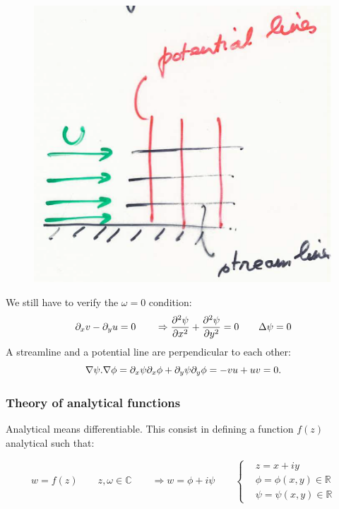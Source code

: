  		\begin{figure}
		\vspace{-5mm}
		\includegraphics[scale=0.3]{ch2/24}
		\label{fig:2.23}
		\end{figure}
		We still have to verify the $\omega=0$ condition:
 		\begin{equation}
 		\D _x v - \D _y u = 0 \qquad \Rightarrow \frac{\D ^2 \psi}{\D x^2} + \frac{\D ^2 \psi}{\D y^2} = 0 \qquad \Delta \psi = 0
 		\end{equation}
 		A streamline and a potential line are perpendicular to each other:
 		\begin{equation}
 		\nabla \psi . \nabla \phi = \D _x \psi \D _x \phi + \D_ y \psi \D _y \phi = -vu + uv = 0. 
 		\end{equation}
 		
 		
 	\subsubsection{Theory of analytical functions}
 		Analytical means differentiable. This consist in defining a function $f(z)$ analytical such that:
 		
 		\begin{equation}
 		 w = f(z) \qquad z,\omega \in \mathbb{C} \qquad \Rightarrow w = \phi +i \psi \qquad \left\{
 		 \begin{aligned}
			&z= x+iy\\ 		 
			&\phi = \phi (x,y) \in \mathbb{R}\\
			&\psi =  \psi(x,y) \in \mathbb{R}
\end{aligned} 		  
 		 \right.
 		\end{equation}
 		
